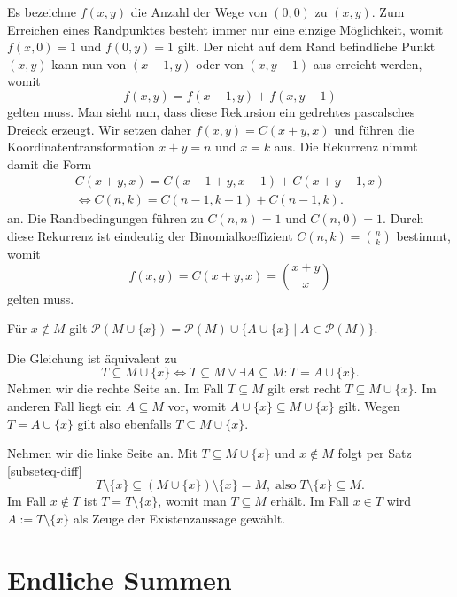 \begin{Beweis}[Beweis 2]
Es bezeichne $f(x,y)$ die Anzahl der Wege von $(0,0)$
zu $(x,y)$. Zum Erreichen eines Randpunktes besteht immer nur eine
einzige Möglichkeit, womit $f(x,0)=1$ und $f(0,y)=1$ gilt. Der nicht
auf dem Rand befindliche Punkt $(x,y)$ kann nun von $(x-1,y)$ oder von
$(x,y-1)$ aus erreicht werden, womit
\[f(x,y) = f(x-1,y) + f(x,y-1)\]
gelten muss. Man sieht nun, dass diese Rekursion ein gedrehtes
pascalsches Dreieck erzeugt. Wir setzen daher $f(x,y) = C(x+y,x)$ und
führen die Koordinatentransformation $x+y=n$ und $x=k$ aus. Die
Rekurrenz nimmt damit die Form
\begin{gather*}
C(x+y,x) = C(x-1+y,x-1) + C(x+y-1,x)\\
\iff C(n,k) = C(n-1,k-1) + C(n-1,k).
\end{gather*}
an. Die Randbedingungen führen zu $C(n,n)=1$ und $C(n,0)=1$. Durch diese
Rekurrenz ist eindeutig der Binomialkoeffizient $C(n,k)=\binom{n}{k}$
bestimmt, womit
\[f(x,y) = C(x+y,x) = \binom{x+y}{x}\]
gelten muss.\,\qedsymbol
\end{Beweis}

\begin{Satz}\newlinefirst
Für $x\notin M$ gilt $\mathcal P(M\cup\{x\}) = \mathcal P(M)\cup\{A\cup\{x\}\mid A\in\mathcal P(M)\}$.
\end{Satz}
\begin{Beweis}
Die Gleichung ist äquivalent zu
\[T\subseteq M\cup\{x\}\iff T\subseteq M\lor\exists A\subseteq M\colon T=A\cup\{x\}.\]
Nehmen wir die rechte Seite an. Im Fall $T\subseteq M$ gilt erst
recht $T\subseteq M\cup\{x\}$. Im anderen Fall liegt ein $A\subseteq M$
vor, womit $A\cup\{x\}\subseteq M\cup\{x\}$ gilt. Wegen $T=A\cup\{x\}$
gilt also ebenfalls $T\subseteq M\cup\{x\}$.

Nehmen wir die linke Seite an. Mit $T\subseteq M\cup\{x\}$ und
$x\notin M$ folgt per Satz \ref{subseteq-diff}
\[T\setminus\{x\}\subseteq (M\cup\{x\})\setminus\{x\} = M,
\;\text{also}\; T\setminus\{x\}\subseteq M.\]
Im Fall $x\notin T$ ist
$T=T\setminus\{x\}$, womit man $T\subseteq M$
erhält. Im Fall $x\in T$ wird $A:=T\setminus\{x\}$
als Zeuge der Existenzaussage gewählt.\,\qedsymbol
\end{Beweis}

\newpage
\section{Endliche Summen}

